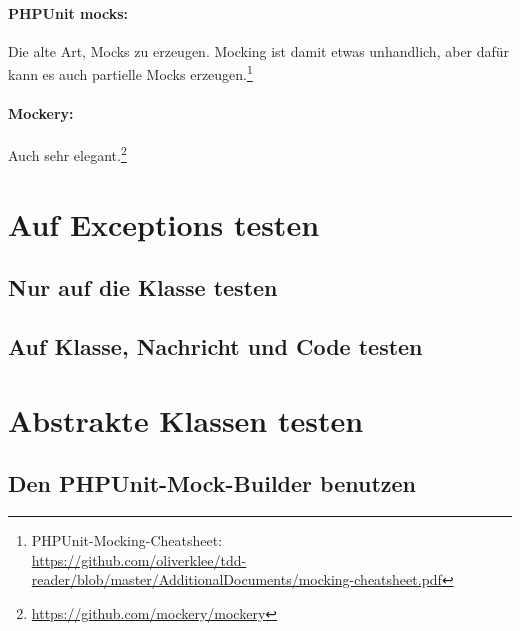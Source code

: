 \documentclass[a4paper,10pt,headsepline]{scrartcl}
\begin{document}
\paragraph{PHPUnit mocks:} Die alte Art, Mocks zu erzeugen. Mocking ist damit etwas unhandlich, aber dafür kann es auch partielle Mocks erzeugen.\footnote{PHPUnit-Mocking-Cheatsheet:\\ \url{https://github.com/oliverklee/tdd-reader/blob/master/AdditionalDocuments/mocking-cheatsheet.pdf}}
\paragraph{Mockery:} Auch sehr elegant.\footnote{\url{https://github.com/mockery/mockery}}



\pagebreak
\section{Auf Exceptions testen}

\subsection{Nur auf die Klasse testen}

\subsection{Auf Klasse, Nachricht und Code testen}


\pagebreak
\section{Abstrakte Klassen testen}

\subsection{Den PHPUnit-Mock-Builder benutzen}
\end{document}
